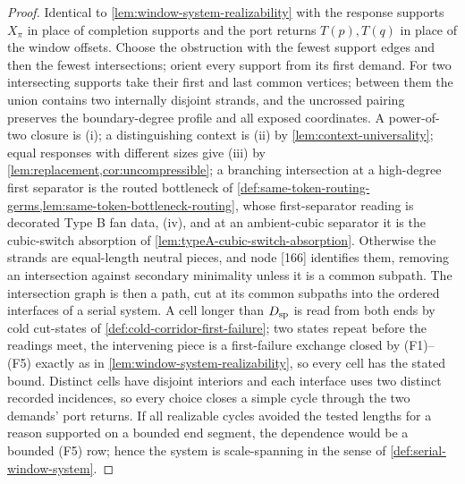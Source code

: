 \documentclass[11pt]{article}
\begin{document}
\begin{proof}
Identical to \cref{lem:window-system-realizability} with the response supports
\(X_\pi\) in place of completion supports and the port returns \(T(p),T(q)\)
in place of the window offsets.  Choose the obstruction with the fewest support
edges and then the fewest intersections; orient every support from its first
demand.  For two intersecting supports take their first and last common
vertices; between them the union contains two internally disjoint strands, and
the uncrossed pairing preserves the boundary-degree profile and all exposed
coordinates.  A power-of-two closure is (i); a distinguishing context is (ii) by
\cref{lem:context-universality}; equal responses with different sizes give
(iii) by \cref{lem:replacement,cor:uncompressible}; a branching intersection at
a high-degree first separator is the routed bottleneck of
\cref{def:same-token-routing-germs,lem:same-token-bottleneck-routing}, whose
first-separator reading is decorated Type B fan data, (iv), and at an
ambient-cubic separator it is the cubic-switch absorption of
\cref{lem:typeA-cubic-switch-absorption}.  Otherwise the strands are
equal-length neutral pieces, and node [166] identifies them, removing an
intersection against secondary minimality unless it is a common subpath.  The
intersection graph is then a path, cut at its common subpaths into the ordered
interfaces of a serial system.  A cell longer than \(D_{\rm sp}\) is read from
both ends by cold cut-states of \cref{def:cold-corridor-first-failure}; two
states repeat before the readings meet, the intervening piece is a first-failure
exchange closed by (F1)--(F5) exactly as in
\cref{lem:window-system-realizability}, so every cell has the stated bound.
Distinct cells have disjoint interiors and each interface uses two distinct
recorded incidences, so every choice closes a simple cycle through the two
demands' port returns.  If all realizable cycles avoided the tested lengths
for a reason supported on a bounded end segment, the dependence would be a
bounded (F5) row; hence the system is scale-spanning in the sense of
\cref{def:serial-window-system}.
\end{proof}
\end{document}
